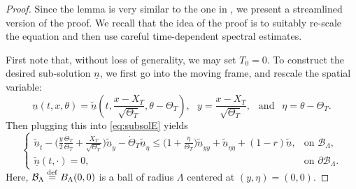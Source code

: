 \documentclass[11pt]{article}    %
\newcommand{\EB}[1]{\textcolor{blue}{#1}}
\newcommand{\eps}{\varepsilon}
\begin{document}
\begin{proof}%
Since the lemma is very similar to the one in \cite{BHR_Acceleration}, we present a streamlined version of the proof. We recall that the idea of the proof is to suitably re-scale the equation and then use careful time-dependent spectral estimates.

First note that, without loss of generality, we may set $T_0 = 0$.  To construct the desired sub-solution $\underline n$, we first go into the moving frame, and rescale the spatial variable:
\begin{equation}\label{eq:v}
\underline{n}(t,x,\theta) = \underline{\tilde n}\left( t, \frac{x - X_T}{\sqrt{\Theta_T}}, \theta - \Theta_T\right),~~~
y = \frac{x - X_T}{\sqrt{\Theta_T}}, ~~\text{ and }~~ \eta = \theta - \Theta_T.
\end{equation}
Then plugging this into \eqref{eq:subsolE} yields  
\begin{equation}\label{eq:v_inequality}
\begin{cases}
	\displaystyle\underline{\tilde n}_t  - \Big(\frac{y}{2} \frac{\dot\Theta_T}{\Theta_T} + \frac{\dot{X}_T}{\sqrt{\Theta_T}} \Big)\underline{\tilde n}_y  - \dot\Theta_T \underline{\tilde n}_\eta \leq \Big(1 + \frac{\eta}{\Theta_T}\Big) \underline{\tilde n}_{yy} + \underline{\tilde n}_{\eta\eta} + (1 - r) \underline{\tilde n}, &\text{on } \mathcal{B}_\Lambda,\\
\underline{\tilde n}(t,\cdot) = 0, &\text{on } \partial\mathcal{B}_\Lambda.	
	\end{cases}
\end{equation}
Here, $\mathcal{B}_\Lambda\stackrel{\rm def}{=}B_\Lambda(0,0)$ is a ball of radius $\Lambda$ centered at $(y,\eta) = (0,0)$.   

\end{proof}
\end{document}
